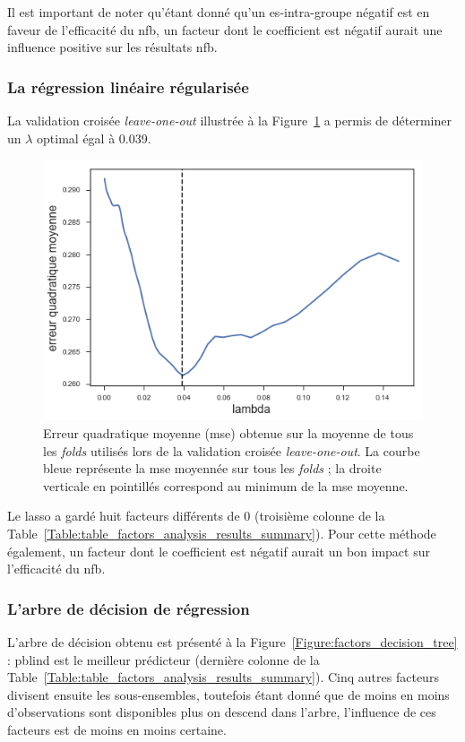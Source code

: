 Il est important de noter qu'étant donné qu'un \gls{es}-intra-groupe négatif est en faveur de l'efficacité du \gls{nfb},
un facteur dont le coefficient est négatif aurait une influence positive sur les résultats \gls{nfb}.


\subsubsection{La régression linéaire régularisée}

La validation croisée \textit{leave-one-out} illustrée à la Figure~\ref{Figure:selection_lambda_lasso} a permis de déterminer un $\lambda$ optimal égal à 0.039.
\begin{figure}[h!]
  \centering
	\includegraphics[width=0.5\linewidth]{figures/chapter-3/factors-selection-lasso-best-lambda} 
  \caption{Erreur quadratique moyenne (\gls{mse}) obtenue sur la moyenne de tous les \textit{folds} utilisés lors de la validation 
	croisée \textit{leave-one-out}. La courbe bleue représente la \gls{mse} moyennée sur tous les \textit{folds} ; la droite verticale en pointillés correspond
	au minimum de la \gls{mse} moyenne.}
  \label{Figure:selection_lambda_lasso}
\end{figure}

Le \gls{lasso} a gardé huit facteurs différents de 0 (troisième colonne de la Table~\ref{Table:table_factors_analysis_results_summary}). Pour cette méthode également,
un facteur dont le coefficient est négatif aurait un bon impact sur l'efficacité du \gls{nfb}.

\subsubsection{L'arbre de décision de régression}

L'arbre de décision obtenu est présenté à la Figure~\ref{Figure:factors_decision_tree} : \gls{pblind} est le meilleur prédicteur (dernière colonne de la
Table~\ref{Table:table_factors_analysis_results_summary}). Cinq autres facteurs divisent ensuite les sous-ensembles, toutefois étant donné que de moins
en moins d'observations sont disponibles plus on descend dans l'arbre, l'influence de ces facteurs est de moins en moins certaine.

